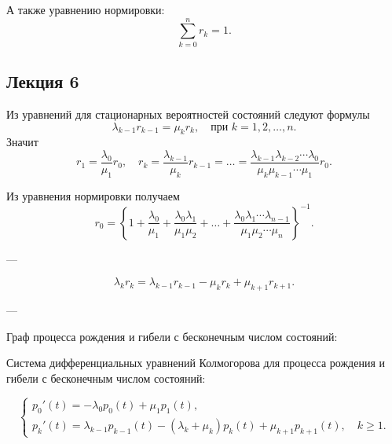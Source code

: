 А также уравнению нормировки:
\[
	\sum_{k=0}^{n} r_k = 1.
\]

\subsection{Лекция 6}

Из уравнений для стационарных вероятностей состояний следуют формулы
\[
	\lambda_{k-1} r_{k-1} = \mu_k r_k, \quad \text{при } k = 1, 2, \ldots, n.
\]
Значит
\[
	r_1 = \frac{\lambda_0}{\mu_1} r_0, \quad
	r_k = \frac{\lambda_{k-1}}{\mu_k} r_{k-1} = \ldots =
	\frac{\lambda_{k-1} \lambda_{k-2} \cdots \lambda_0}{\mu_k \mu_{k-1} \cdots \mu_1} r_0.
\]

Из уравнения нормировки получаем
\[
	r_0 =
	\left\{
	1 +
	\frac{\lambda_0}{\mu_1} +
	\frac{\lambda_0 \lambda_1}{\mu_1 \mu_2} +
	\ldots +
	\frac{\lambda_0 \lambda_1 \cdots \lambda_{n-1}}{\mu_1 \mu_2 \cdots \mu_n}
	\right\}^{-1}.
\]

---

\[
	\lambda_k r_k = \lambda_{k-1} r_{k-1} - \mu_k r_k + \mu_{k+1} r_{k+1}.
\]

---

Граф процесса рождения и гибели с бесконечным числом состояний:

\begin{center}
\end{center}

Система дифференциальных уравнений Колмогорова для процесса рождения и гибели
с бесконечным числом состояний:

\[
	\begin{cases}
		p_0'(t) = -\lambda_0 p_0(t) + \mu_1 p_1(t), \\[6pt]
		p_k'(t) = \lambda_{k-1} p_{k-1}(t)
		- (\lambda_k + \mu_k) p_k(t)
		+ \mu_{k+1} p_{k+1}(t), \quad k \ge 1.
	\end{cases}
\]

